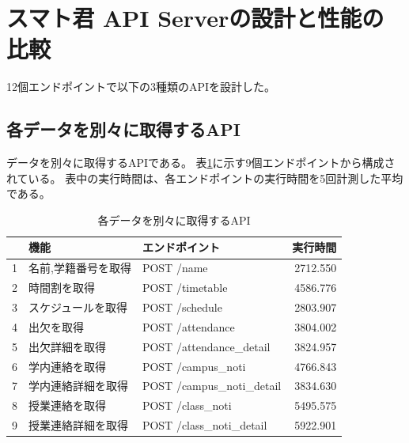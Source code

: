 \documentclass[a4j,12pt,onecolumn,oneside,titlepage,openany,final]{jreport}
\begin{document}
\section{スマト君 API Serverの設計と性能の比較}
12個エンドポイントで以下の3種類のAPIを設計した。
\subsection{各データを別々に取得するAPI}\label{api}
データを別々に取得するAPIである。
表\ref{uri}に示す9個エンドポイントから構成されている。
表中の実行時間は、各エンドポイントの実行時間を5回計測した平均である。
\begin{table}[htbp]
\caption{各データを別々に取得するAPI}
\begin{tabular}{|l|l|l|r|}
\hline
   & 機能         & エンドポイント    & \multicolumn{1}{l|}{実行時間} \\ \hline
1  & 名前,学籍番号を取得 & POST /name & 2712.550                   \\ \hline
2  & 時間割を取得                        & POST /timetable            & 4586.776    \\ \hline
3  & スケジュールを取得                     & POST /schedule             & 2803.907    \\ \hline
4  & 出欠を取得                         & POST /attendance           & 3804.002    \\ \hline
5  & 出欠詳細を取得                       & POST /attendance\_detail   & 3824.957    \\ \hline
6  & 学内連絡を取得                       & POST /campus\_noti         & 4766.843    \\ \hline
7  & 学内連絡詳細を取得                     & POST /campus\_noti\_detail & 3834.630     \\ \hline
8  & 授業連絡を取得                       & POST /class\_noti          & 5495.575    \\ \hline
9  & 授業連絡詳細を取得                     & POST /class\_noti\_detail  & 5922.901    \\ \hline
\end{tabular}
\label{uri}
\end{table}
\end{document}

